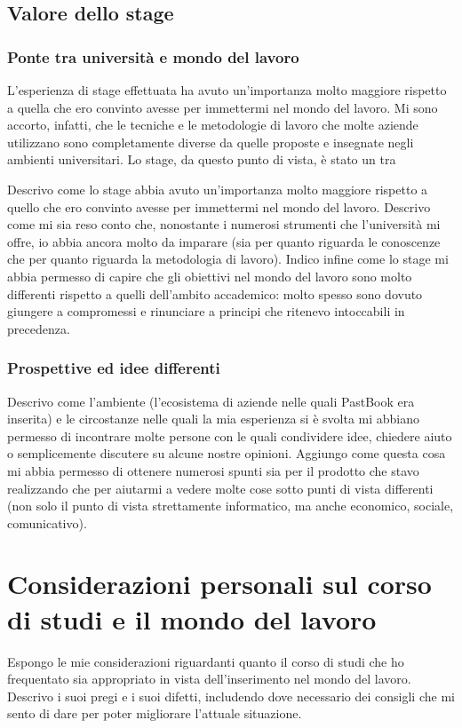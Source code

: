 		\subsection{Valore dello stage}
			\subsubsection{Ponte tra università e mondo del lavoro}
				L'esperienza di stage effettuata ha avuto un'importanza molto maggiore rispetto a quella che ero convinto avesse per
				immettermi nel mondo del lavoro. Mi sono accorto, infatti, che le tecniche e le metodologie di lavoro che molte
				aziende utilizzano sono completamente diverse da quelle proposte e insegnate negli ambienti universitari. Lo stage,
				da questo punto di vista, è stato un tra
				
				Descrivo come lo stage abbia avuto un'importanza molto maggiore rispetto a quello che ero convinto avesse per
				immettermi nel mondo del lavoro. Descrivo come mi sia reso conto che, nonostante i numerosi strumenti che
				l'università mi offre, io abbia ancora molto da imparare (sia per quanto riguarda le conoscenze che per quanto
				riguarda la metodologia di lavoro). Indico infine come lo stage mi abbia permesso di capire che gli obiettivi nel
				mondo del lavoro sono molto differenti rispetto a quelli dell'ambito accademico: molto spesso sono dovuto giungere
				a compromessi e rinunciare a principi che ritenevo intoccabili in precedenza.
			\subsubsection{Prospettive ed idee differenti}
				Descrivo come l'ambiente (l'ecosistema di aziende nelle quali PastBook era inserita) e le circostanze nelle quali la
				mia esperienza si è svolta mi abbiano permesso di incontrare molte persone con le quali condividere idee, chiedere
				aiuto o semplicemente discutere su alcune nostre opinioni. Aggiungo come questa cosa mi abbia permesso di ottenere
				numerosi spunti sia per il prodotto che stavo realizzando che per aiutarmi a vedere molte cose sotto punti di vista
				differenti (non solo il punto di vista strettamente informatico, ma anche economico, sociale, comunicativo).
	\section{Considerazioni personali sul corso di studi e il mondo del lavoro}
		Espongo le mie considerazioni riguardanti quanto il corso di studi che ho frequentato sia appropriato in vista dell'inserimento
		nel mondo del lavoro. Descrivo i suoi pregi e i suoi difetti, includendo dove necessario dei consigli che mi sento di dare per
		poter migliorare l'attuale situazione.
